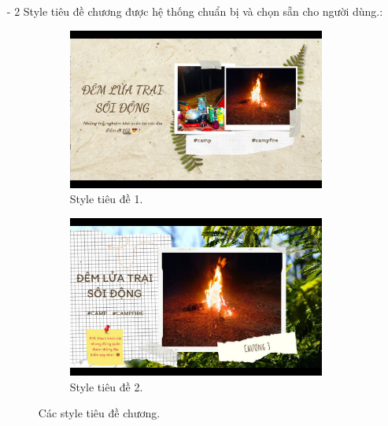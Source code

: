 \begin{enumerate}
    \begin{itemize}
        \item[-] 2 Style tiêu đề chương được hệ thống chuẩn bị và chọn sẵn cho người dùng.:
        \begin{figure}[H]
            \centering
            \begin{subfigure}{0.48\textwidth}
                \includegraphics[width=1\linewidth]{figures/c4/4_1/title_1.jpg} 
                \caption{Style tiêu đề 1.}
            \end{subfigure}
            \hfill
            \begin{subfigure}{0.48\textwidth}
                \includegraphics[width=1\linewidth]{figures/c4/4_1/title_2.jpg} 
                \caption{Style tiêu đề 2.}
            \end{subfigure}
            \caption{Các style tiêu đề chương.}
            \label{fig:chapter-title-styles}
        \end{figure}
        

\end{itemize}
\end{enumerate}
